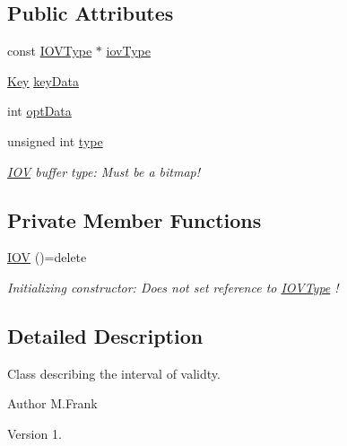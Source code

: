 \subsection*{Public Attributes}
\begin{DoxyCompactItemize}
\item 
const \hyperlink{class_d_d4hep_1_1_i_o_v_type}{I\+O\+V\+Type} $\ast$ \hyperlink{class_d_d4hep_1_1_i_o_v_a885a5ed2be528cf1db783cade2a0b838}{iov\+Type}
\item 
\hyperlink{class_d_d4hep_1_1_i_o_v_a07cb46dc875296dc9cccf4ff370104ae}{Key} \hyperlink{class_d_d4hep_1_1_i_o_v_a28eb02fd8d9c45b770e6a234303991de}{key\+Data}
\item 
int \hyperlink{class_d_d4hep_1_1_i_o_v_a0bd227cbdf7eab4949e12bffc7238d72}{opt\+Data}
\item 
unsigned int \hyperlink{class_d_d4hep_1_1_i_o_v_a497f2859ca7cb011151ae6b977b50aa0}{type}
\begin{DoxyCompactList}\small\item\em \hyperlink{class_d_d4hep_1_1_i_o_v}{I\+OV} buffer type\+: Must be a bitmap! \end{DoxyCompactList}\end{DoxyCompactItemize}
\subsection*{Private Member Functions}
\begin{DoxyCompactItemize}
\item 
\hyperlink{class_d_d4hep_1_1_i_o_v_a7fd68c48e4ff18f072be1ca44f9a27dd}{I\+OV} ()=delete
\begin{DoxyCompactList}\small\item\em Initializing constructor\+: Does not set reference to \hyperlink{class_d_d4hep_1_1_i_o_v_type}{I\+O\+V\+Type} ! \end{DoxyCompactList}\end{DoxyCompactItemize}


\subsection{Detailed Description}
Class describing the interval of validty. 

\begin{DoxyAuthor}{Author}
M.\+Frank 
\end{DoxyAuthor}
\begin{DoxyVersion}{Version}
1. 
\end{DoxyVersion}


